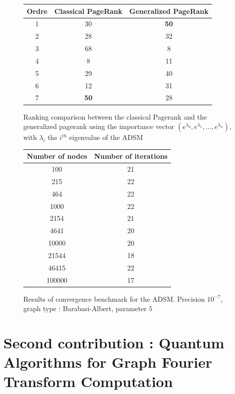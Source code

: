 \documentclass[sn-mathphys]{sn-jnl}%
\theoremstyle{thmstyleone}%
\theoremstyle{thmstyletwo}%
\theoremstyle{thmstylethree}%
\begin{document}
\begin{figure}[H]
    \centering
    
\begin{tabular}{c|c|c}
    \textbf{Ordre} & \textbf{Classical PageRank} & \textbf{Generalized PageRank} \\
    \hline
        1 & 30 & \textbf{50} \\
    2 & 28 & 32\\
    3 & 68 & 8\\
    4 & 8 & 11\\
    5 & 29 & 40 \\
    6 & 12 & 31\\
    7 & \textbf{50} & 28\\
    \hline
    
\end{tabular}

    \caption{Ranking comparison between the classical Pagerank and the generalized pagerank using the importance vector $(e^{\lambda_0}, e^{\lambda_1}, \hdots, e^{\lambda_n})$, with $\lambda_i$ the $i^{th}$ eigenvalue of the ADSM}
    \label{fig:ranking2}
\end{figure}

\begin{figure}[H]
    \centering
    \begin{tabular}{c|c}
        \textbf{Number of nodes} & \textbf{Number of iterations}\\
        \hline
        100 & 21 \\
        215 & 22 \\
464 & 22 \\
1000 & 22 \\
2154 & 21 \\
4641 & 20 \\
10000 & 20 \\
21544 & 18 \\
46415 & 22 \\
100000 & 17
    \end{tabular}
    \caption{Results of convergence benchmark for the ADSM. Precision $10^{-7}$, graph type : Barabasi-Albert, parameter $5$}
    \label{fig:benchmark}
\end{figure}

\section{Second contribution : Quantum Algorithms for Graph Fourier Transform Computation}
\label{sec:quantumPagerank}
\end{document}
